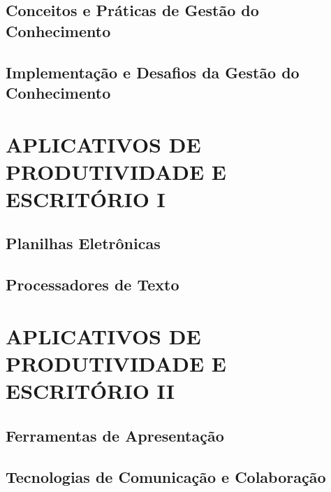 \documentclass[
]{book}
\begin{document}
\section{Conceitos e Práticas de Gestão do Conhecimento}\label{conceitos-e-pruxe1ticas-de-gestuxe3o-do-conhecimento}

\section{Implementação e Desafios da Gestão do Conhecimento}\label{implementauxe7uxe3o-e-desafios-da-gestuxe3o-do-conhecimento}

\chapter{APLICATIVOS DE PRODUTIVIDADE E ESCRITÓRIO I}\label{aplicativos-de-produtividade-e-escrituxf3rio-i}

\section{Planilhas Eletrônicas}\label{planilhas-eletruxf4nicas}

\section{Processadores de Texto}\label{processadores-de-texto}

\chapter{APLICATIVOS DE PRODUTIVIDADE E ESCRITÓRIO II}\label{aplicativos-de-produtividade-e-escrituxf3rio-ii}

\section{Ferramentas de Apresentação}\label{ferramentas-de-apresentauxe7uxe3o}

\section{Tecnologias de Comunicação e Colaboração}\label{tecnologias-de-comunicauxe7uxe3o-e-colaborauxe7uxe3o}

  
\end{document}
